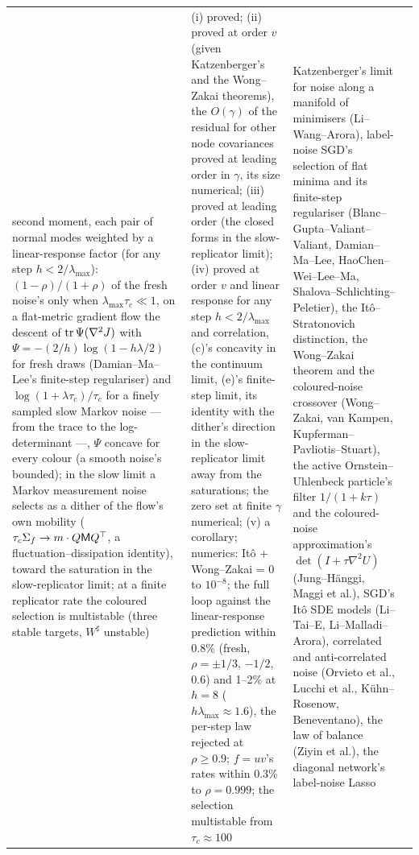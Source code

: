{\begin{longtable}{@{}>{\raggedright\arraybackslash}p{}>{\raggedright\arraybackslash}p{}%
>{\raggedright\arraybackslash}p{}>{\raggedright\arraybackslash}p{}@{}}
second moment, each pair of normal modes weighted by a linear-response factor (for any step $h < 2/\lambda_{\max}$):
$(1 - \rho)/(1 + \rho)$ of the fresh noise's only when $\lambda_{\max}\tau_c\ll1$, on a flat-metric gradient flow the
descent of $\operatorname{tr}\Psi(\nabla^2J)$ with $\Psi = -(2/h)\log(1 - h\lambda/2)$ for fresh draws (Damian--Ma--Lee's finite-step
regulariser) and $\log(1 + \lambda\tau_c)/\tau_c$ for a finely sampled slow Markov noise --- from the trace to the
log-determinant ---, $\Psi$ concave for every colour (a smooth noise's bounded); in the slow limit a Markov measurement
noise selects as a dither of the flow's own mobility ($\tau_c\Sigma_f\to m\cdot Q\mathsf MQ^\top$, a
fluctuation--dissipation identity), toward the saturation in the slow-replicator limit; at a finite replicator rate the
coloured selection is multistable (three stable targets, $W^\sharp$ unstable)
& (i) proved; (ii) proved at order $v$ (given Katzenberger's and the Wong--Zakai theorems), the $O(\gamma)$ of the
residual for other node covariances proved at leading order in $\gamma$, its size numerical; (iii) proved at leading
order (the closed forms in the slow-replicator limit); (iv) proved at order $v$ and linear response for any step
$h < 2/\lambda_{\max}$ and correlation, (c)'s concavity in the continuum limit, (e)'s finite-step limit, its identity
with the dither's direction in the slow-replicator limit away from the saturations; the zero set at finite $\gamma$
numerical; (v) a corollary; numerics: It\^o + Wong--Zakai = 0 to $10^{-8}$; the full loop against the linear-response
prediction within 0.8\% (fresh, $\rho = \pm1/3$, $-1/2$, 0.6) and 1--2\% at $h = 8$ ($h\lambda_{\max}\approx1.6$), the
per-step law rejected at $\rho\ge0.9$; $f = uv$'s rates within 0.3\% to $\rho = 0.999$; the selection multistable from
$\tau_c\approx100$
& Katzenberger's limit for noise along a manifold of minimisers (Li--Wang--Arora), label-noise SGD's selection of flat
minima and its finite-step regulariser (Blanc--Gupta--Valiant--Valiant, Damian--Ma--Lee, HaoChen--Wei--Lee--Ma,
Shalova--Schlichting--Peletier), the It\^o--Stratonovich distinction, the Wong--Zakai theorem and the coloured-noise
crossover (Wong--Zakai, van Kampen, Kupferman--Pavliotis--Stuart), the active Ornstein--Uhlenbeck particle's filter
$1/(1 + k\tau)$ and the coloured-noise approximation's $\det(I + \tau\nabla^2U)$ (Jung--H\"anggi, Maggi et al.), SGD's
It\^o SDE models (Li--Tai--E, Li--Malladi--Arora), correlated and anti-correlated noise (Orvieto et al., Lucchi et al.,
K\"uhn--Rosenow, Beneventano), the law of balance (Ziyin et al.), the diagonal network's label-noise Lasso

\end{longtable}}
